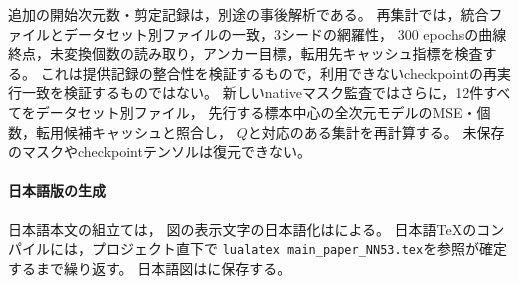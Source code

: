 \documentclass[11pt,a4paper]{ltjsarticle}
\begin{document}
追加の開始次元数・剪定記録は，別途の事後解析である。
再集計では，統合ファイルとデータセット別ファイルの一致，3シードの網羅性，
300 epochsの曲線終点，未変換個数の読み取り，アンカー目標，転用先キャッシュ指標を検査する。
これは提供記録の整合性を検証するもので，利用できないcheckpointの再実行一致を検証するものではない。
新しいnativeマスク監査ではさらに，12件すべてをデータセット別ファイル，
先行する標本中心の全次元モデルのMSE・個数，転用候補キャッシュと照合し，
$Q$と対応のある集計を再計算する。
未保存のマスクやcheckpointテンソルは復元できない。

\paragraph{日本語版の生成}
日本語本文の組立ては，
図の表示文字の日本語化はによる。
日本語TeXのコンパイルには，プロジェクト直下で
\texttt{lualatex main\_paper\_NN53.tex}を参照が確定するまで繰り返す。
日本語図はに保存する。
\end{document}
